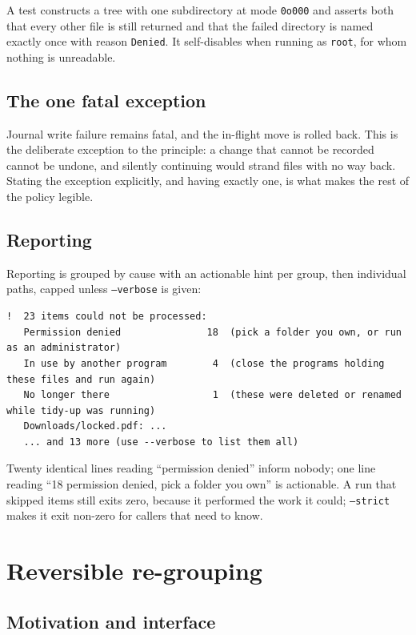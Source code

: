 \documentclass[11pt,a4paper]{article}
\newcommand{\code}[1]{\texttt{\small #1}}
\begin{document}
A test constructs a tree with one subdirectory at mode \code{0o000} and asserts both
that every other file is still returned and that the failed directory is named exactly
once with reason \code{Denied}. It self-disables when running as \code{root}, for whom
nothing is unreadable.

\subsection{The one fatal exception}

Journal write failure remains fatal, and the in-flight move is rolled back. This is
the deliberate exception to the principle: a change that cannot be recorded cannot be
undone, and silently continuing would strand files with no way back. Stating the
exception explicitly, and having exactly one, is what makes the rest of the policy
legible.

\subsection{Reporting}

Reporting is grouped by cause with an actionable hint per group, then individual
paths, capped unless \code{--verbose} is given:

\begin{lstlisting}[style=shell]
!  23 items could not be processed:
   Permission denied               18  (pick a folder you own, or run as an administrator)
   In use by another program        4  (close the programs holding these files and run again)
   No longer there                  1  (these were deleted or renamed while tidy-up was running)
   Downloads/locked.pdf: ...
   ... and 13 more (use --verbose to list them all)
\end{lstlisting}

Twenty identical lines reading \enquote{permission denied} inform nobody; one line
reading \enquote{18 permission denied, pick a folder you own} is actionable. A run
that skipped items still exits zero, because it performed the work it could;
\code{--strict} makes it exit non-zero for callers that need to know.

\section{Reversible re-grouping}
\label{sec:regroup}

\subsection{Motivation and interface}
\end{document}
